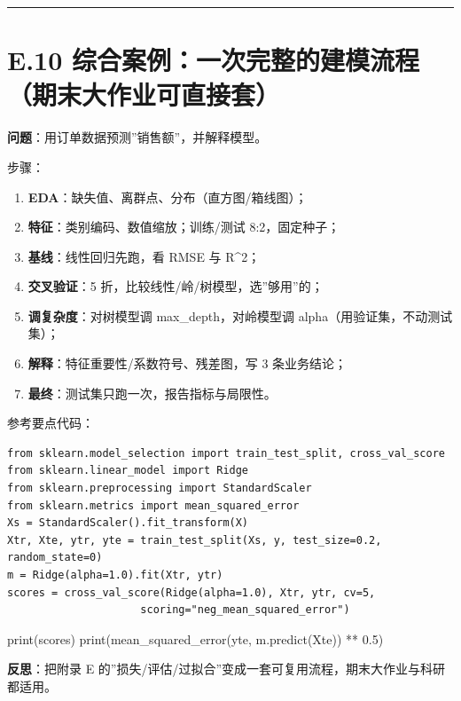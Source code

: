 \begin{center}\rule{0.5\linewidth}{0.5pt}\end{center}

\section{E.10
综合案例：一次完整的建模流程（期末大作业可直接套）}\label{e.10-ux7efcux5408ux6848ux4f8bux4e00ux6b21ux5b8cux6574ux7684ux5efaux6a21ux6d41ux7a0bux671fux672bux5927ux4f5cux4e1aux53efux76f4ux63a5ux5957}

\textbf{问题}：用订单数据预测''销售额''，并解释模型。

步骤：

\begin{enumerate}
\def\labelenumi{\arabic{enumi}.}
\tightlist
\item
  \textbf{EDA}：缺失值、离群点、分布（直方图/箱线图）；
\item
  \textbf{特征}：类别编码、数值缩放；训练/测试 8:2，固定种子；
\item
  \textbf{基线}：线性回归先跑，看 RMSE 与 R\^{}2；
\item
  \textbf{交叉验证}：5 折，比较线性/岭/树模型，选''够用''的；
\item
  \textbf{调复杂度}：对树模型调 max\_depth，对岭模型调
  alpha（用验证集，不动测试集）；
\item
  \textbf{解释}：特征重要性/系数符号、残差图，写 3 条业务结论；
\item
  \textbf{最终}：测试集只跑一次，报告指标与局限性。
\end{enumerate}

参考要点代码：

\begin{verbatim}
from sklearn.model_selection import train_test_split, cross_val_score
from sklearn.linear_model import Ridge
from sklearn.preprocessing import StandardScaler
from sklearn.metrics import mean_squared_error
Xs = StandardScaler().fit_transform(X)
Xtr, Xte, ytr, yte = train_test_split(Xs, y, test_size=0.2, random_state=0)
m = Ridge(alpha=1.0).fit(Xtr, ytr)
scores = cross_val_score(Ridge(alpha=1.0), Xtr, ytr, cv=5,
                     scoring="neg_mean_squared_error")
\end{verbatim}

print(scores) print(mean\_squared\_error(yte, m.predict(Xte)) ** 0.5)

\textbf{反思}：把附录 E
的''损失/评估/过拟合''变成一套可复用流程，期末大作业与科研都适用。

